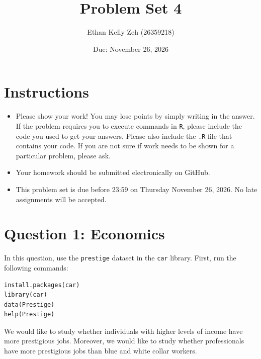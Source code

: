 \documentclass[12pt,letterpaper]{article}
\title{Problem Set 4}
\date{Due: November 26, 2026}
\author{Ethan Kelly Zeh (26359218)}
\begin{document}
	\maketitle
	\section*{Instructions}
	\begin{itemize}
		\item Please show your work! You may lose points by simply writing in the answer. If the problem requires you to execute commands in \texttt{R}, please include the code you used to get your answers. Please also include the \texttt{.R} file that contains your code. If you are not sure if work needs to be shown for a particular problem, please ask.
		\item Your homework should be submitted electronically on GitHub.
		\item This problem set is due before 23:59 on Thursday November 26, 2026. No late assignments will be accepted.
	\end{itemize}



	\vspace{.5cm}
\section*{Question 1: Economics}
\vspace{.25cm}
\noindent 	
In this question, use the \texttt{prestige} dataset in the \texttt{car} library. First, run the following commands:

\begin{verbatim}
install.packages(car)
library(car)
data(Prestige)
help(Prestige)
\end{verbatim} 


\noindent We would like to study whether individuals with higher levels of income have more prestigious jobs. Moreover, we would like to study whether professionals have more prestigious jobs than blue and white collar workers.
\end{document}
